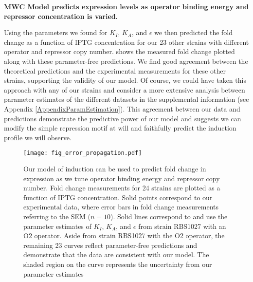 \noindent \textbf{MWC Model predicts expression levels as operator binding energy and repressor concentration is varied.}

Using the parameters we found for $K_I$, $K_A$, and $\epsilon$ we then predicted the fold change as a function of IPTG concentration for our 23 other strains with different operator and repressor copy number.  shows the measured fold change plotted along with these parameter-free predictions. We find good agreement between the theoretical predictions and the experimental measurements for these other strains, supporting the validity of our model. Of course, we could have taken this approach with any of our strains and consider a more extensive analysis between parameter estimates of the different datasets in the supplemental information (see Appendix \ref{AppendixParamEstimation}). This agreement between our data and predictions demonstrate the predictive power of our model and suggests we can modify the simple repression motif at will and faithfully predict the induction profile we will observe.


\begin{figure}[h]
	\centering
	\texttt{[image: fig\_error\_propagation.pdf]}
	\caption{Our model of induction can be used to predict fold change in expression as we tune operator binding energy and repressor copy number. \tiny{ } Fold
		change measurements for 24 strains are plotted as a function of IPTG concentration. Solid points
		correspond to our experimental data, where error bars in fold change
		measurements referring to the SEM ($n=10$). Solid lines correspond to
		\eref[eq7] and use the parameter estimates of $K_I$, $K_A$, and $\epsilon$ from
		strain RBS1027 with an O2 operator. Aside from strain RBS1027 with the O2
		operator, the remaining 23 curves reflect parameter-free predictions and
		demonstrate that the data are consistent with our model. The shaded region on
		the curve represents the uncertainty from our parameter estimates}
		\label{fig_result2}
\end{figure}

